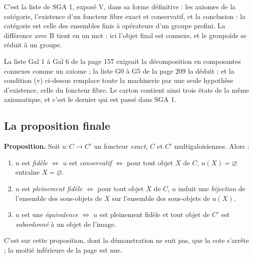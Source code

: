 \documentclass[11pt,a4paper]{article}
\begin{document}
C'est la liste de SGA 1, exposé V, dans sa forme définitive : les axiomes de la
catégorie, l'existence d'un foncteur fibre exact et conservatif, et la
conclusion : la catégorie est celle des ensembles finis à opérateurs d'un
groupe profini. La différence avec B tient en un mot : ici l'objet final est
connexe, et le groupoïde se réduit à un groupe.

La liste Gal 1 à Gal 6 de la
page 157 exigeait la décomposition en composantes connexes comme un axiome ;
la liste G0 à G5 de la page 209 la déduit ; et la condition (v) ci-dessus
remplace toute la machinerie par une seule hypothèse d'existence, celle du
foncteur fibre. Le carton contient ainsi trois états de la même axiomatique,
et c'est le dernier qui est passé dans SGA 1.

\subsection*{La proposition finale}

\textbf{Proposition.} Soit $u : C \to C'$ un foncteur \emph{exact}, $C$ et
$C'$ multigaloisiennes. Alors :

\begin{enumerate}
  \item[(i)] $u$ est \emph{fidèle} $\Longleftrightarrow$ $u$ est
    \emph{conservatif} $\Longleftrightarrow$ pour tout objet $X$ de $C$,
    $u(X) = \varnothing$ entraîne $X = \varnothing$.
  \item[(ii)] $u$ est \emph{pleinement fidèle} $\Longleftrightarrow$ pour tout
    objet $X$ de $C$, $u$ induit une \emph{bijection} de l'ensemble des
    sous-objets de $X$ sur l'ensemble des sous-objets de $u(X)$.
  \item[(iii)] $u$ est une \emph{équivalence} $\Longleftrightarrow$ $u$ est
    pleinement fidèle et tout objet de $C'$ est \emph{subordonné} à un objet de
    l'image.
\end{enumerate}

C'est sur cette proposition, dont la démonstration ne suit pas, que la cote
s'arrête ; la moitié inférieure de la page est nue.
\end{document}

